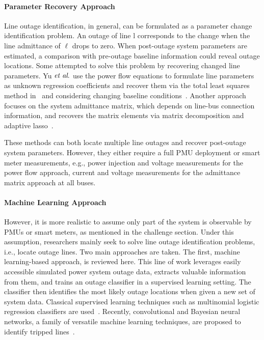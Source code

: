 \paragraph{Parameter Recovery Approach}
Line outage identification, in general, can be formulated as a parameter change identification problem. An outage of line l corresponds to the change when the line admittance of $\ell$ drops to zero. When post-outage system parameters are estimated, a comparison with pre-outage baseline information could reveal outage locations. Some attempted to solve this problem by recovering changed line parameters. Yu $\textit{et al}.$ use the power flow equations to formulate line parameters as unknown regression coefficients and recover them via the total least squares method in~\cite{Yu2018} and considering changing baseline conditions~\cite{Yu2019}. Another approach focuses on the system admittance matrix, which depends on line-bus connection information, and recovers the matrix elements via matrix decomposition and adaptive lasso~\cite{Babakmehr2016,Ardakanian2019a}. 

These methods can both locate multiple line outages and recover post-outage system parameters. However, they either require a full PMU deployment or smart meter measurements, e.g., power injection and voltage measurements for the power flow approach, current and voltage measurements for the admittance matrix approach at all buses.

\paragraph{Machine Learning Approach}
However, it is more realistic to assume only part of the system is observable by PMUs or smart meters, as mentioned in the challenge section. Under this assumption, researchers mainly seek to solve line outage identification problems, i.e., locate outage lines. Two main approaches are taken. The first, machine learning-based approach, is reviewed here. This line of work leverages easily accessible simulated power system outage data, extracts valuable information from them, and trains an outage classifier in a supervised learning setting. The classifier then identifies the most likely outage locations when given a new set of system data. Classical supervised learning techniques such as multinomial logistic regression classifiers are used~\cite{Garcia2016,Kim2018}. Recently, convolutional and Bayesian neural networks, a family of versatile machine learning techniques, are proposed to identify tripped lines~\cite{Li2019a,Zhao2020}. 

